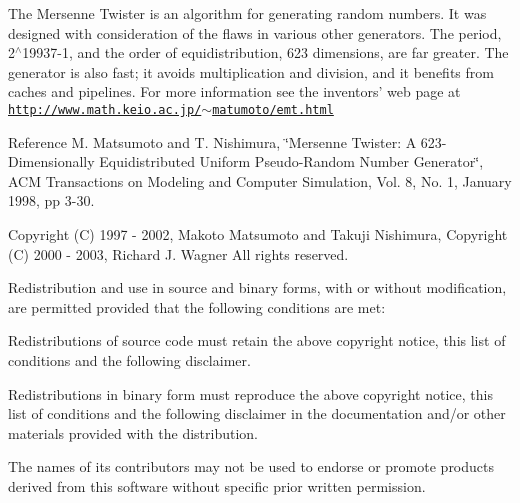 The Mersenne Twister is an algorithm for generating random numbers. It was designed with consideration of the flaws in various other generators. The period, 2$^\wedge$19937-\/1, and the order of equidistribution, 623 dimensions, are far greater. The generator is also fast; it avoids multiplication and division, and it benefits from caches and pipelines. For more information see the inventors' web page at \href{http://www.math.keio.ac.jp/~matumoto/emt.html}{\tt http\-://www.\-math.\-keio.\-ac.\-jp/$\sim$matumoto/emt.\-html}

Reference M. Matsumoto and T. Nishimura, \char`\"{}\-Mersenne Twister\-: A 623-\/\-Dimensionally
\-Equidistributed Uniform Pseudo-\/\-Random Number Generator\char`\"{}, A\-C\-M Transactions on Modeling and Computer Simulation, Vol. 8, No. 1, January 1998, pp 3-\/30.

Copyright (C) 1997 -\/ 2002, Makoto Matsumoto and Takuji Nishimura, Copyright (C) 2000 -\/ 2003, Richard J. Wagner All rights reserved.

Redistribution and use in source and binary forms, with or without modification, are permitted provided that the following conditions are met\-:


\begin{DoxyEnumerate}
\item Redistributions of source code must retain the above copyright notice, this list of conditions and the following disclaimer.
\item Redistributions in binary form must reproduce the above copyright notice, this list of conditions and the following disclaimer in the documentation and/or other materials provided with the distribution.
\item The names of its contributors may not be used to endorse or promote products derived from this software without specific prior written permission.
\end{DoxyEnumerate}


